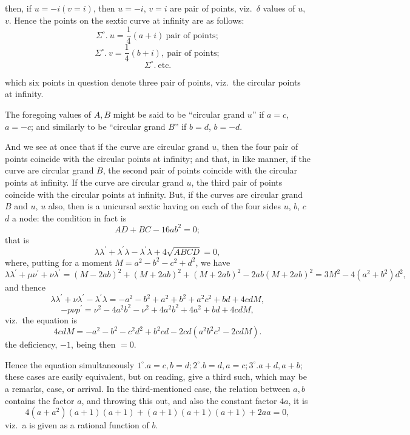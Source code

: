 \documentclass[11pt,a4paper]{book}
\begin{document}
\noindent
then, if $u = -i (v = i)$, then $u = -i$, $v = i$ are pair of points, viz.\ $\delta$ values of $u$, $v$.
Hence the points on the sextic curve at infinity are as follows:
\[
\Sigma^\circ.\ u = \frac{1}{4} (a + i)\ \text{pair of points};
\]
\[
\Sigma^\circ.\ v = \frac{1}{4} (b + i),\ \text{pair of points};
\]
\[
\Sigma^\circ.\ \text{etc.}
\]

\noindent
which six points in question denote three pair of points, viz.\ the circular points
at infinity.

The foregoing values of $A, B$ might be said to be ``circular grand $u$'' if $a = c$,
$a = -c$; and similarly to be ``circular grand $B$'' if $b = d$, $b = -d$.

And we see at once that if the curve are circular grand $u$, then the four pair
of points coincide with the circular points at infinity; and that, in like manner, if
the curve are circular grand $B$, the second pair of points coincide with the circular
points at infinity. If the curve are circular grand $u$, the third pair of points coincide
with the circular points at infinity. But, if the curves are circular grand $B$ and $u$, $u$
also, then is a unicursal sextic having on each of the four sides $u$, $b$, $c$ $d$ a node:
the condition in fact is
\[
AD + BC - 16 a b^2 = 0;
\]
that is
\[
\lambda\lambda^\prime + \lambda^\prime\lambda - \lambda^\prime\lambda + 4\sqrt{ABCD} = 0,
\]
where, putting for a moment $M = a^2 - b^2 - c^2 + d^2$, we have
\[
\lambda\lambda^\prime + \mu\nu^\prime + \nu\lambda^\prime = (M - 2 a b)^2 + (M + 2 a b)^2 + (M + 2 a b)^2 - 2 a b(M + 2 a b)^2 = 3M^2 - 4(a^2 + b^2)d^2,
\]
and thence
\[
\lambda\lambda^\prime + \nu\lambda^\prime - \lambda^\prime\lambda = -a^2 - b^2 + a^2 + b^2 + a^2 c^2 + bd + 4 c d M,
\]
\[
- p\nu p^\prime = \nu^2 - 4 a^2 b^2 - \nu^2 + 4 a^2 b^2 + 4 a^2 + b d + 4 c d M,
\]
viz.\ the equation is
\[
4 c d M = -a^2 - b^2 - c^2 d^2 + b^2 c d - 2 c d (a^2 b^2 c^2 - 2 c d M).
\]
the deficiency, $- 1$, being then $= 0$.

Hence the equation simultaneously $1^\circ. a = c, b = d; 2^\circ. b = d, a = c; 3^\circ. a + d, a + b$;
these cases are easily equivalent, but on reading, give a third such, which may be a remarks,
case, or arrival. In the third-mentioned case, the relation between $a, b$
contains the factor $a$, and throwing this out, and also the constant factor $4a$, it is
\[
4(a + a^2)(a + 1)(a + 1) + (a + 1)(a + 1)(a + 1) + 2 a a = 0,
\]
viz.\ a is given as a rational function of $b$.

\clearpage
\end{document}
